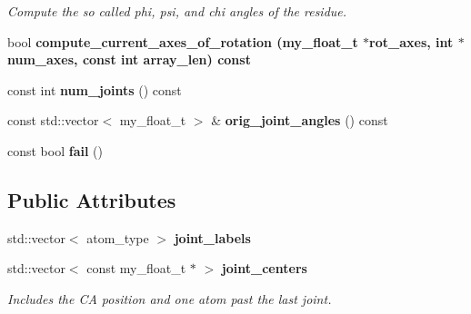 \begin{CompactItemize}
\begin{CompactList}\small\item\em Compute the so called phi, psi, and chi angles of the residue. \item\end{CompactList}\item 
bool \bf{compute\_\-current\_\-axes\_\-of\_\-rotation} (my\_\-float\_\-t $\ast$rot\_\-axes, int $\ast$num\_\-axes, const int array\_\-len) const 
\item 
const int \textbf{num\_\-joints} () const \label{classASCbase_1_1residue__joints_6220137846303fb3cf73b4c02caaffd9}

\item 
const std::vector$<$ my\_\-float\_\-t $>$ \& \textbf{orig\_\-joint\_\-angles} () const \label{classASCbase_1_1residue__joints_45063f6a978d049bf4f5292b08241a93}

\item 
const bool \textbf{fail} ()\label{classASCbase_1_1residue__joints_fa5def7bc8d49c67da7ddc906f045c24}

\end{CompactItemize}
\subsection*{Public Attributes}
\begin{CompactItemize}
\item 
std::vector$<$ atom\_\-type $>$ \textbf{joint\_\-labels}\label{classASCbase_1_1residue__joints_61eee08b238efdfad0ec815eb47b0d26}

\item 
std::vector$<$ const my\_\-float\_\-t $\ast$ $>$ \bf{joint\_\-centers}\label{classASCbase_1_1residue__joints_a548886503607e03cdce112eb9ac92c9}

\begin{CompactList}\small\item\em Includes the CA position and one atom past the last joint. \item\end{CompactList}\end{CompactItemize}
